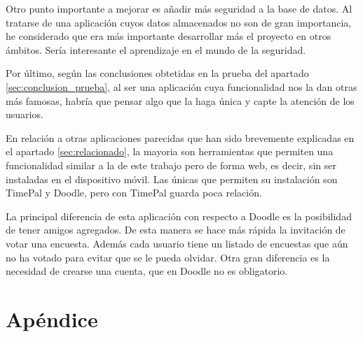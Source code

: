 \documentclass[a4paper, 12pt]{book}
\begin{document}
Otro punto importante a mejorar es a\~nadir m\'as seguridad a la base de datos. Al tratarse de una aplicaci\'on cuyos datos almacenados no son de gran importancia, he considerado que era m\'as importante desarrollar m\'as el proyecto en otros \'ambitos. Ser\'ia interesante el aprendizaje en el mundo de la seguridad.

Por \'ultimo, seg\'un las conclusiones obtetidas en la prueba del apartado \ref{sec:conclusion_prueba}, al ser una aplicaci\'on cuya funcionalidad nos la dan otras m\'as famosas, habr\'ia que pensar algo que la haga \'unica y capte la atenci\'on de los usuarios.

En relaci\'on a otras aplicaciones parecidas que han sido brevemente explicadas en el apartado \ref{sec:relacionado}, la mayoria son herramientas que permiten una funcionalidad similar a la de este trabajo pero de forma web, es decir, sin ser instaladas en el dispositivo m\'ovil. Las \'unicas que permiten su instalaci\'on son TimePal y Doodle, pero con TimePal guarda poca relaci\'on. 

La principal diferencia de esta aplicaci\'on con respecto a Doodle es la posibilidad de tener amigos agregados. De esta manera se hace m\'as r\'apida la invitaci\'on de votar una encuesta. Adem\'as cada usuario tiene un listado de encuestas que a\'un no ha votado para evitar que se le pueda olvidar. Otra gran diferencia es la necesidad de crearse una cuenta, que en Doodle no es obligatorio.


\cleardoublepage
\appendix

\chapter{Ap\'endice}

\vspace{20em}



\end{document}
